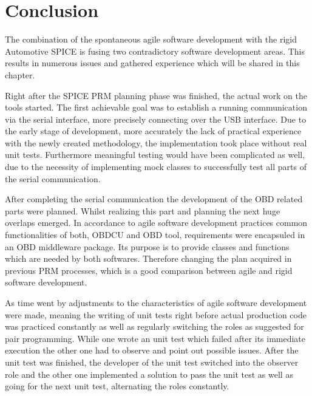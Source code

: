

\chapter{Conclusion}
\label{sec:conclusion}

The combination of the spontaneous agile software development with the rigid Automotive SPICE is fusing two contradictory software development areas. 
This results in numerous issues and gathered experience which will be shared in this chapter.

Right after the SPICE PRM planning phase was finished, the actual work on the tools started. The first achievable goal was to establish a 
running communication via the serial interface, more precisely connecting over the USB interface. Due to the early stage of development, more 
accurately the lack of practical experience with the newly created methodology, the implementation took place without real unit tests. 
Furthermore meaningful testing would have been complicated as well, due to the necessity of implementing mock classes to successfully test 
all parts of the serial communication.

After completing the serial communication the development of the OBD related parts were planned. Whilst realizing this part and planning the next 
huge overlaps emerged. In accordance to agile software development practices common functionalities of both, OBDCU and OBD tool, requirements were 
encapsuled in an OBD middleware package. Its purpose is to provide classes and functions which are needed by both softwares. Therefore changing the 
plan acquired in previous PRM processes, which is a good comparison between agile and rigid software development.

As time went by adjustments to the characteristics of agile software development were made, meaning the writing of unit tests right before actual 
production code was practiced constantly as well as regularly switching the roles as suggested for pair programming. While one wrote an unit 
test which failed after its immediate execution the other one had to observe and point out possible issues. After the unit test was finished, 
the developer of the unit test switched into the observer role and the other one implemented a solution to pass the unit test as well as going 
for the next unit test, alternating the roles constantly.

